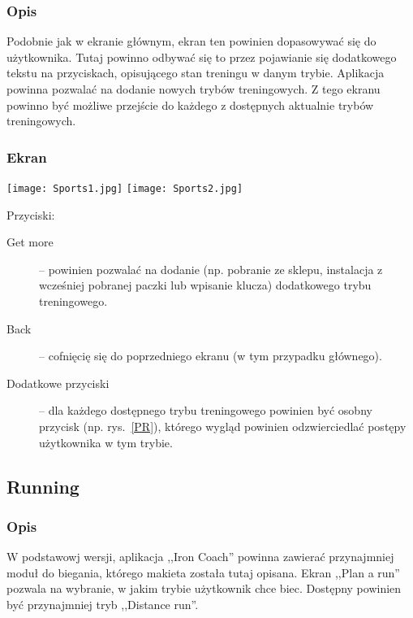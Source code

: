 \subsubsection{Opis}
\noindent Podobnie jak w ekranie głównym, ekran ten powinien dopasowywać się do użytkownika. Tutaj powinno odbywać się to przez pojawianie się dodatkowego tekstu na przyciskach, opisującego stan treningu w danym trybie. Aplikacja powinna pozwalać na dodanie nowych trybów treningowych. Z tego ekranu powinno być możliwe przejście do każdego z dostępnych aktualnie trybów treningowych.
\subsubsection{Ekran}
\begin{minipage}{0.5\textwidth}
  \texttt{[image: Sports1.jpg]}
  \label{S1}
  \texttt{[image: Sports2.jpg]}
  \label{S2}
\end{minipage}
\begin{minipage}{0.5\textwidth}
Przyciski:\\
\begin{description}
  \item[Get more] -- powinien pozwalać na dodanie (np. pobranie ze sklepu, instalacja z wcześniej pobranej paczki lub wpisanie klucza) dodatkowego trybu treningowego.
  \item[Back] -- cofnięcię się do poprzedniego ekranu (w tym przypadku głównego).
  \item[Dodatkowe przyciski] -- dla każdego dostępnego trybu treningowego powinien być osobny przycisk (np. rys.~\ref{PR}), którego wygląd powinien odzwierciedlać postępy użytkownika w tym trybie.
\end{description}
\end{minipage}
\subsection{Running}
\subsubsection{Opis}
\noindent W podstawowj wersji, aplikacja ,,Iron Coach'' powinna zawierać przynajmniej moduł do biegania, którego makieta została tutaj opisana. Ekran ,,Plan a run'' pozwala na wybranie, w jakim trybie użytkownik chce biec. Dostępny powinien być przynajmniej tryb ,,Distance run''.
